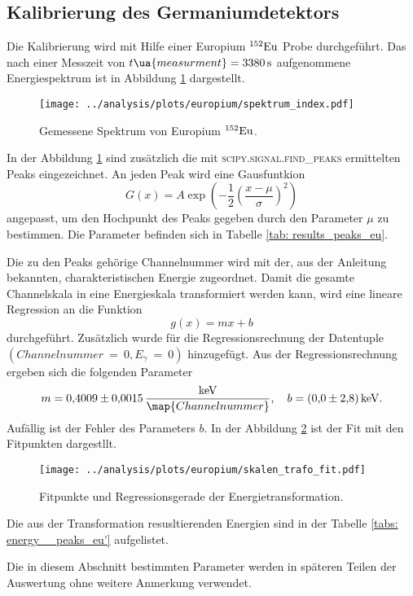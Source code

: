 \subsection{Kalibrierung des Germaniumdetektors}\label{sec:kalibrierung}
\FloatBarrier
Die Kalibrierung wird mit Hilfe einer Europium $^{152}\ce{Eu}$ Probe
durchgeführt. Das nach einer Messzeit von $t\ua{measurment}=\SI{3380}{\second}$
aufgenommene Energiespektrum ist in Abbildung \ref{fig:spectrum_europ} dargestellt.
\begin{figure}
  \centering
  \texttt{[image: ../analysis/plots/europium/spektrum\_index.pdf]}
  \caption{Gemessene Spektrum von Europium $^{152}\ce{Eu}$.}
  \label{fig:spectrum_europ}
\end{figure}
In der Abbildung \ref{fig:spectrum_europ} sind zusätzlich die mit
\textsc{scipy.signal.find\_{peaks}} ermittelten Peaks eingezeichnet.
An jeden Peak wird eine Gausfuntkion
\begin{equation}
  \label{eq:gaus}
  G(x)=A\exp{\left(-\frac{1}{2}\left(\frac{x-\mu}{\sigma}\right)^2\right)}
\end{equation}
angepasst, um den Hochpunkt des Peaks gegeben durch den Parameter $\mu$ zu
bestimmen. Die Parameter befinden sich in Tabelle \ref{tab: results_peaks_eu}.

Die zu den Peaks gehörige Channelnummer wird mit der, aus der Anleitung \cite{anleitungV18}
bekannten, charakteristischen Energie zugeordnet.
Damit die gesamte Channelskala in eine Energieskala transformiert werden kann,
wird eine lineare Regression an die Funktion
\begin{equation*}
  g(x)=mx+b
\end{equation*}
durchgeführt. Zusätzlich wurde für die Regressionsrechnung der Datentuple\newline
$(Channelnummer~=~0,E_\gamma~=~0)$ hinzugefügt.
 Aus der Regressionsrechnung ergeben sich die folgenden Parameter
\begin{equation}
  \label{eq:channel_energie_trafo}
  m=\num{0.4009\pm0.0015}\,\frac{\si{\kilo\eV}}{\map{Channelnummer}}, \quad b=\SI{0.0\pm2.8}{\kilo\eV}.
\end{equation}
Aufällig ist der Fehler des Parameters $b$.
In der Abbildung \ref{fig:skalen_trafo_fit} ist der Fit mit den Fitpunkten dargestllt.
\begin{figure}
  \centering
  \texttt{[image: ../analysis/plots/europium/skalen\_trafo\_fit.pdf]}
  \caption{Fitpunkte und Regressionsgerade der Energietransformation.}
  \label{fig:skalen_trafo_fit}
\end{figure}
Die aus der Transformation resusltierenden Energien sind in der Tabelle \ref{tabs: energy__peaks_eu'}
aufgelistet.

Die in diesem Abschnitt bestimmten Parameter werden in späteren Teilen der Auswertung
ohne weitere Anmerkung verwendet.
\FloatBarrier


